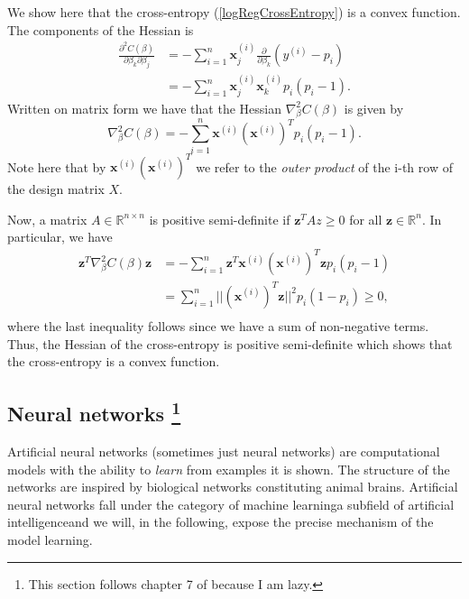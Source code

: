 \documentclass[a4paper, twocolumn]{article}
\begin{document}
We show here that the cross-entropy (\ref{logRegCrossEntropy}) is a convex function. 
The components of the Hessian is 
\begin{align*}
 \frac{\partial^2C(\beta)}{ \partial \beta_k \partial \beta_j}  &= - \sum_{i=1}^n \mathbf{x}_j^{(i)} \frac{\partial}{\partial \beta_k} \left( y^{(i)} - p_i \right) \\
 &= - \sum_{i=1}^n \mathbf{x}_j^{(i)} \mathbf{x}_k^{(i)} p_i(p_i-1).
\end{align*}
Written on matrix form we have that the Hessian $\nabla^2_\beta C(\beta)$ is given by
\begin{equation}
 \nabla^2_\beta C(\beta) = -\sum_{i=1}^n \mathbf{x}^{(i)} (\mathbf{x}^{(i)})^T p_i (p_i-1).
\end{equation}
Note here that by $\mathbf{x}^{(i)} (\mathbf{x}^{(i)})^T$ we refer to the \textit{outer product} of the i-th row of the design matrix 
$X$.

Now, a matrix $A \in \mathbb{R}^{n \times n}$ is positive semi-definite if $\mathbf{z}^T A z \geq 0$ for all $\mathbf{z} \in \mathbb{R}^n$.
In particular, we have 
\begin{align*}
 \mathbf{z}^T \nabla^2_\beta C(\beta) \mathbf{z} &=  -\sum_{i=1}^n \mathbf{z}^T \mathbf{x}^{(i)} (\mathbf{x}^{(i)})^T \mathbf{z} p_i(p_i-1) \\
 &= \sum_{i=1}^n || (\mathbf{x}^{(i)})^T \mathbf{z} ||^2 p_i (1-p_i) \geq 0, \\
\end{align*}
where the last inequality follows since we have a sum of non-negative terms. Thus, the Hessian of the cross-entropy is 
positive semi-definite which shows that the cross-entropy is a convex function.


\subsection[Neural networks]{Neural networks \protect\footnote{This section follows chapter 7 of \cite{ledum2017computational} because I am lazy.}}
Artificial neural networks (sometimes just neural networks) are computational models with the ability to \textit{learn} from examples it is shown. The structure of the networks are inspired by biological networks constituting animal brains. Artificial neural networks fall under the category of machine learning\textemdash a subfield of artificial intelligence\textemdash and we will, in the following, expose the precise mechanism of the model learning. 
\end{document}
